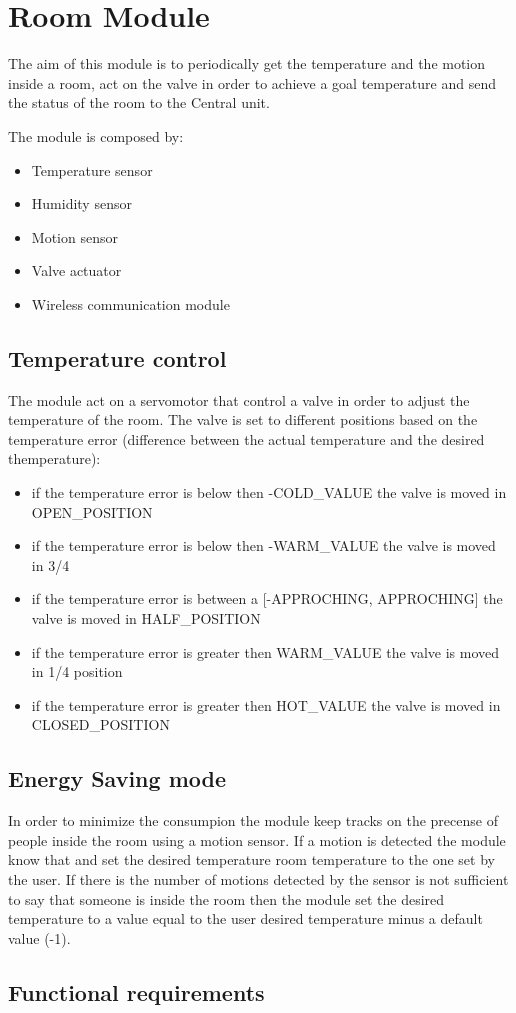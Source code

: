 \section{Room Module}
The aim of this module is to periodically get the temperature and the motion inside a room,
act on the valve in order to achieve a goal temperature and send the status of the room to the
Central unit.

The module is composed by:
\begin{itemize}
	\item Temperature sensor
	\item Humidity sensor
	\item Motion sensor
	\item Valve actuator
	\item Wireless communication module
\end{itemize}

\subsection{Temperature control}
The module act on a servomotor that control a valve in order to adjust the temperature of the room.
The valve is set to different positions based on the temperature error (difference between the actual temperature and the desired themperature):
\begin{itemize}
	\item if the temperature error is below then -COLD\_VALUE the valve is moved in OPEN\_POSITION
	\item if the temperature error is below then -WARM\_VALUE the valve is moved in 3/4
	\item if the temperature error is between a [-APPROCHING, APPROCHING] the valve is moved in HALF\_POSITION
	\item if the temperature error is greater then WARM\_VALUE the valve is moved in 1/4 position
	\item if the temperature error is greater then HOT\_VALUE the valve is moved in CLOSED\_POSITION
\end{itemize}

\subsection{Energy Saving mode}
In order to minimize the consumpion the module keep tracks on the precense of people inside the room
using a motion sensor.
If a motion is detected the module know that and set the desired temperature room temperature to the one set by the user.
If there is the number of motions detected by the sensor is not sufficient to say that someone is inside the room then the module set
the desired temperature to a value equal to the user desired temperature minus a default value (-1\degree).

\newpage
\subsection{Functional requirements}

